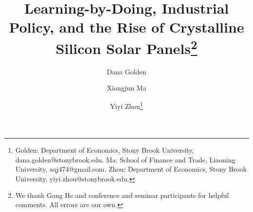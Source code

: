 \documentclass[12pt]{article}
\begin{document}
\title{Learning-by-Doing, Industrial Policy, and the Rise of Crystalline Silicon Solar Panels\footnote{We thank Gang He and conference and seminar participants for helpful comments. All errors are our own.}}
\author{Dana Golden \and Xiangjun Ma \and  Yiyi Zhou\thanks{Golden: Department of Economics, Stony Brook University, dana.golden@stonybrook.edu. Ma: School of Finance and Trade, Liaoning University, aqj474@gmail.com. Zhou: Department of Economics, Stony Brook University, yiyi.zhou@stonybrook.edu.}}



\maketitle
\end{document}

